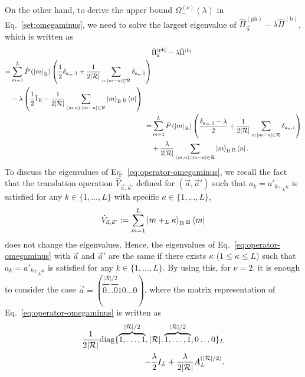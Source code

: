 \documentclass[twocolumn,superscriptaddress,pra,footinbib,notitlepage]{revtex4-1}
\newcommand{\1}{\mbox{1}\hspace{-0.25em}\mbox{l}}
\newcommand{\abs}[1]{\lvert#1\rvert}
\begin{document}
On the other hand, to derive the upper bound $\Omega_-^{(\nu)}(\lambda)$ in Eq.~\eqref{set:omegaminus}, we need to solve the largest eigenvalue of $\hat{\Pi}_{\vec{a}}^{(\textrm{ph})}-\lambda\hat{\Pi}^{(\textrm{b})}$, which is written as
\begin{align}
&\hat{\Pi}_{\vec{a}}^{(\textrm{ph})}-\lambda\hat{\Pi}^{(\textrm{b})}\nonumber\\
\begin{split}
=&\sum_{m=1}^L\hat{P}\left(\ket{m}_\textrm{B}\right)\left(\frac{1}{2}\delta_{a_m, 1}+\frac{1}{2\abs{\mathcal{R}}}\sum_{n:\abs{m-n}\in\mathcal{R}}\delta_{a_n, 1}\right)\\
&-\lambda\left(\frac{1}{2}\hat{1}_\textrm{B}-\frac{1}{2\abs{\mathcal{R}}}\sum_{(m, n):\abs{m-n}\in\mathcal{R}}\ket{m}_\textrm{B}{}_\textrm{B}\bra{n}\right)
\end{split}\nonumber\\
=&\sum_{m=1}^L\hat{P}\left(\ket{m}_\textrm{B}\right)\left(\frac{\delta_{a_m, 1}-\lambda}{2}+\frac{1}{2\abs{\mathcal{R}}}\sum_{n:\abs{m-n}\in\mathcal{R}}\delta_{a_n, 1}\right)\nonumber\\
&+\frac{\lambda}{2\abs{\mathcal{R}}}\sum_{(m, n):\abs{m-n}\in\mathcal{R}}\ket{m}_\textrm{B}{}_\textrm{B}\bra{n}.
\label{eq:operator-omegaminus}
\end{align}
To discuss the eigenvalues of Eq.~\eqref{eq:operator-omegaminus}, we recall the fact that the translation operation $\hat{V}_{\vec{a}, \vec{a}'}$ defined for $(\vec{a}, \vec{a}')$ such that $a_k=a'_{k+_L\kappa}$ is satisfied for any $k\in\{1,\dots, L\}$ with specific $\kappa\in\{1,\dots,L\}$,
\begin{align}
\hat{V}_{\vec{a}, \vec{a}'}:=\sum_{m=1}^L\ket{m+_L\kappa}_\textrm{B}{}_\textrm{B}\bra{m}\label{defi:translation-operator}
\end{align}
does not change the eigenvalues.
Hence, the eigenvalues of Eq.~\eqref{eq:operator-omegaminus} with $\vec{a}$ and $\vec{a}'$ are the same if there exists $\kappa$ ($1\leq \kappa\leq L$) such that $a_k=a'_{k+_L\kappa}$ is satisfied for any $k\in\{1,\dots, L\}$.
By using this, for $\nu=2$, it is enough to consider the case $\vec{a}=(\overbrace{0\dots0}^{\abs{\mathcal{R}}/2}10\dots0)$, where the matrix representation of Eq.~\eqref{eq:operator-omegaminus} is written as
\begin{align}
\frac{1}{2\abs{\mathcal{R}}}\mathrm{diag}\{\overbrace{1,\dots,1}^{\abs{\mathcal{R}}/2}, \abs{\mathcal{R}}, \overbrace{1,\dots,1}^{\abs{\mathcal{R}}/2}, 0\dots0\}_L\nonumber\\
\hfill-\frac{\lambda}{2}I_L+\frac{\lambda}{2\abs{\mathcal{R}}}A^{(\abs{\mathcal{R}}/2)}_L.\label{matrix:omegaminus_nu=2}
\end{align}
\end{document}

